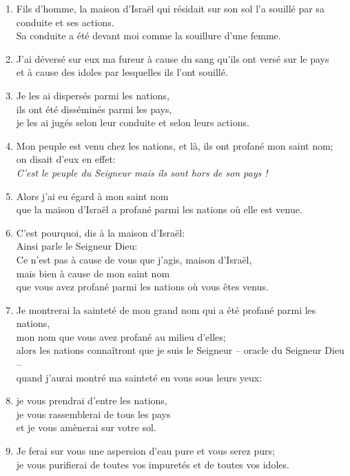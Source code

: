 \documentclass[12pt,a4paper,titlepage]{article}
\def \pslabelsep{0.2em} %
\def \psleftmargin{0em} %
\begin{document}
\begin{enumerate}[leftmargin=\psleftmargin, labelsep = \pslabelsep, label={\arabic*}, font=\color{\pscolor}\small\textsuperscript, parsep=0em, itemsep=0em, topsep=0em ]
\item Fils d’homme, la maison d’Israël qui résidait sur son sol l’a souillé par sa conduite et ses actions. \\ Sa conduite a été devant moi comme la souillure d’une femme.
\item J’ai déversé sur eux ma fureur à cause du sang qu’ils ont versé sur le pays \\ et à cause des idoles par lesquelles ils l’ont souillé.
\item Je les ai dispersés parmi les nations, \\ ils ont été disséminés parmi les pays, \\ je les ai jugés selon leur conduite et selon leurs actions.
\item Mon peuple est venu chez les nations, et là, ils ont profané mon saint nom; \\ on disait d’eux en effet: \\ \og{}\emph{C’est le peuple du Seigneur mais ils sont hors de son pays !}\fg{}
\item Alors j’ai eu égard à mon saint nom \\ que la maison d’Israël a profané parmi les nations où elle est venue. \parSpace
\item C’est pourquoi, dis à la maison d’Israël: \\ Ainsi parle le Seigneur Dieu: \\ Ce n’est pas à cause de vous que j’agis, maison d’Israël, \\ mais bien à cause de mon saint nom \\ que vous avez profané parmi les nations où vous êtes venus.
\item Je montrerai la sainteté de mon grand nom qui a été profané parmi les nations, \\ mon nom que vous avez profané au milieu d’elles; \\ alors les nations connaîtront que je suis le Seigneur – oracle du Seigneur Dieu – \\ quand j’aurai montré ma sainteté en vous sous leurs yeux:
\item je vous prendrai d’entre les nations, \\ je vous rassemblerai de tous les pays \\ et je vous amènerai sur votre sol.
\item Je ferai sur vous une aspersion d’eau pure et vous serez purs; \\ je vous purifierai de toutes vos impuretés et de toutes vos idoles.

\end{enumerate}
\end{document}
